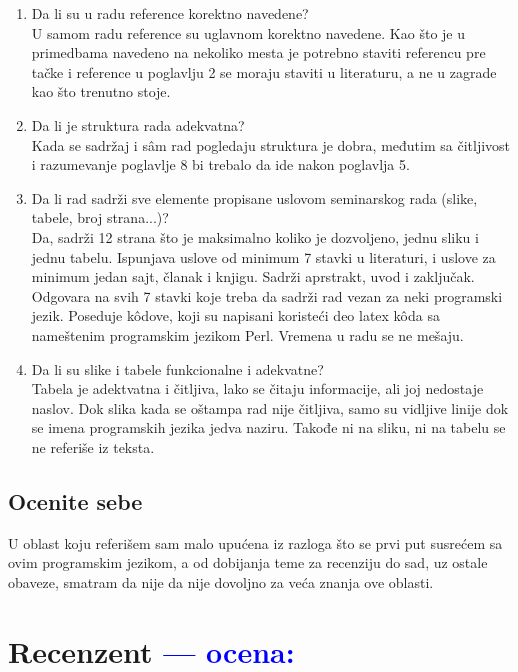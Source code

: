 \documentclass[a4paper]{report}
\newcommand{\odgovor}[1]{\textcolor{blue}{#1}}
\begin{document}
\begin{enumerate}
\item Da li su u radu reference korektno navedene?\\
U samom radu reference su uglavnom korektno navedene. Kao što je u primedbama navedeno na nekoliko mesta je potrebno staviti referencu pre tačke i reference u poglavlju 2 se moraju staviti u literaturu, a ne u zagrade kao što trenutno stoje.
 
\item Da li je struktura rada adekvatna?\\
Kada se sadržaj i s\^{a}m rad pogledaju struktura je dobra, međutim sa čitljivost i razumevanje poglavlje 8 bi trebalo da ide nakon poglavlja 5.

\item Da li rad sadrži sve elemente propisane uslovom seminarskog rada (slike, tabele, broj strana...)?\\
Da, sadrži 12 strana što je maksimalno koliko je dozvoljeno, jednu sliku i jednu tabelu. Ispunjava uslove od minimum 7 stavki u literaturi, i uslove za minimum jedan sajt, članak i knjigu. Sadrži aprstrakt, uvod i zaključak. Odgovara na svih 7 stavki koje treba da sadrži rad vezan za neki programski jezik. Poseduje k\^{o}dove, koji su napisani koristeći deo latex k\^{o}da sa nameštenim programskim jezikom Perl. Vremena u radu se ne mešaju.

\item Da li su slike i tabele funkcionalne i adekvatne?\\
Tabela je adektvatna i čitljiva, lako se čitaju informacije, ali joj nedostaje naslov. Dok slika kada se oštampa rad nije čitljiva, samo su vidljive linije dok se imena programskih jezika jedva naziru. Takođe ni na sliku, ni na tabelu se ne referiše iz teksta.
\end{enumerate}

\section{Ocenite sebe}

U oblast koju referišem sam malo upućena iz razloga što se prvi put susrećem sa ovim programskim jezikom, a od dobijanja teme za recenziju do sad, uz ostale obaveze, smatram da nije da nije dovoljno za veća znanja ove oblasti.

\chapter{Recenzent \odgovor{--- ocena:} }
\end{document}
